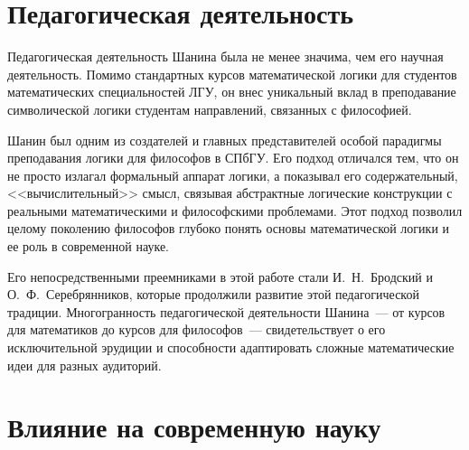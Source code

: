 \documentclass[essay,paper]{pmk-graduate}
\begin{document}
\section{Педагогическая деятельность}

Педагогическая деятельность Шанина была не менее значима, чем его научная деятельность. Помимо стандартных курсов математической логики для студентов математических специальностей ЛГУ, он внес уникальный вклад в преподавание символической логики студентам направлений, связанных с философией.

Шанин был одним из создателей и главных представителей особой парадигмы преподавания логики для философов в СПбГУ. Его подход отличался тем, что он не просто излагал формальный аппарат логики, а показывал его содержательный, <<вычислительный>> смысл, связывая абстрактные логические конструкции с реальными математическими и философскими проблемами. Этот подход позволил целому поколению философов глубоко понять основы математической логики и ее роль в современной науке.

Его непосредственными преемниками в этой работе стали И.~Н.~Бродский и О.~Ф.~Серебрянников, которые продолжили развитие этой педагогической традиции. Многогранность педагогической деятельности Шанина~--- от курсов для математиков до курсов для философов~--- свидетельствует о его исключительной эрудиции и способности адаптировать сложные математические идеи для разных аудиторий.

\section{Влияние на современную науку}
\end{document}
